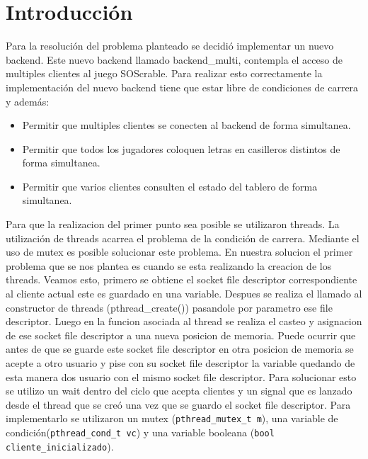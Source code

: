 \section{Introducci\'on}

Para la resoluci\'on del problema planteado se decidi\'o implementar un nuevo backend. Este nuevo backend llamado backend\_multi, contempla el acceso de multiples clientes al juego SOScrable. Para realizar esto correctamente la implementaci\'on del nuevo backend tiene que estar libre de condiciones de carrera y adem\'as:
\begin{itemize}
 \item Permitir que multiples clientes se conecten al backend de forma simultanea.
 \item Permitir que todos los jugadores coloquen letras en casilleros distintos de forma simultanea.
 \item Permitir que varios clientes consulten el estado del tablero de forma simultanea.
\end{itemize}

Para que la realizacion del primer punto sea posible se utilizaron threads. La utilizaci\'on de threads acarrea el problema de la condici\'on de carrera. Mediante el uso de mutex es posible solucionar este problema. En nuestra solucion el primer problema que se nos plantea es cuando se esta realizando la creacion de los threads. Veamos esto, primero se obtiene el socket file descriptor correspondiente al cliente actual este es guardado en una variable. Despues se realiza el llamado al constructor de threads (pthread\_create()) pasandole por parametro ese file descriptor. Luego en la funcion asociada al thread se realiza el casteo y asignacion de ese socket file descriptor a una nueva posicion de memoria. Puede ocurrir que antes de que se guarde este socket file descriptor en otra posicion de memoria se acepte a otro usuario y pise con su socket file descriptor la variable quedando de esta manera dos usuario con el mismo socket file descriptor. Para solucionar esto se utilizo un wait dentro del ciclo que acepta clientes y un signal que es lanzado desde el thread que se cre\'o una vez que se guardo el socket file descriptor. Para implementarlo se utilizaron un mutex (\verb|pthread_mutex_t m|), una variable de condici\'on(\verb|pthread_cond_t vc|) y una variable booleana (\verb|bool cliente_inicializado|).

